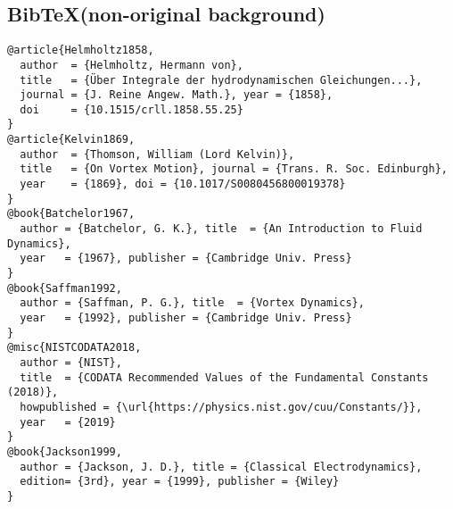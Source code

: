 \documentclass[11pt]{article}
\begin{document}
    \subsection*{Bib\TeX (non-original background)}
        \begin{verbatim}
@article{Helmholtz1858,
  author  = {Helmholtz, Hermann von},
  title   = {Über Integrale der hydrodynamischen Gleichungen...},
  journal = {J. Reine Angew. Math.}, year = {1858},
  doi     = {10.1515/crll.1858.55.25}
}
@article{Kelvin1869,
  author  = {Thomson, William (Lord Kelvin)},
  title   = {On Vortex Motion}, journal = {Trans. R. Soc. Edinburgh},
  year    = {1869}, doi = {10.1017/S0080456800019378}
}
@book{Batchelor1967,
  author = {Batchelor, G. K.}, title  = {An Introduction to Fluid Dynamics},
  year   = {1967}, publisher = {Cambridge Univ. Press}
}
@book{Saffman1992,
  author = {Saffman, P. G.}, title  = {Vortex Dynamics},
  year   = {1992}, publisher = {Cambridge Univ. Press}
}
@misc{NISTCODATA2018,
  author = {NIST},
  title  = {CODATA Recommended Values of the Fundamental Constants (2018)},
  howpublished = {\url{https://physics.nist.gov/cuu/Constants/}},
  year   = {2019}
}
@book{Jackson1999,
  author = {Jackson, J. D.}, title = {Classical Electrodynamics},
  edition= {3rd}, year = {1999}, publisher = {Wiley}
}
        \end{verbatim}
\end{document}
